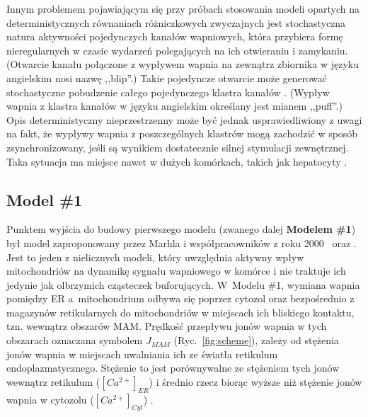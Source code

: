 Innym problemem pojawiającym się przy próbach stosowania modeli opartych na deterministycznych równaniach różniczkowych zwyczajnych jest stochastyczna natura aktywności pojedynczych kanałów wapniowych, która przybiera formę nieregularnych w czasie wydarzeń polegających na ich otwieraniu i zamykaniu. (Otwarcie kanału połączone z wypływem wapnia na zewnątrz zbiornika w języku angielskim nosi nazwę ,,blip''.) Takie pojedyncze otwarcie może generować stochastyczne pobudzenie całego pojedynczego klastra kanałów \cite{Skupin2010}. (Wypływ wapnia z klastra kanałów w języku angielskim określany jest mianem ,,puff''.) Opis deterministyczny nieprzestrzenny może być jednak usprawiedliwiony z uwagi na fakt, że wypływy wapnia z poszczególnych klastrów mogą zachodzić w sposób zsynchronizowany, jeśli są wynikiem dostatecznie silnej stymulacji zewnętrznej. Taka sytuacja ma miejsce nawet w dużych komórkach, takich jak hepatocyty \cite{Dupont2009}.

\FloatBarrier
\subsection{Model \#1}
\label{ss:Mo1}

Punktem wyjścia do budowy pierwszego modelu (zwanego dalej \textbf{Modelem \#1}) był model zaproponowany przez Marhla i współpracowników z roku 2000~\cite{Marhl2000} oraz \cite{Schuster2002}. Jest to jeden z nielicznych modeli, który uwzględnia aktywny wpływ mitochondriów na dynamikę sygnału wapniowego w komórce i nie traktuje ich jedynie jak olbrzymich cząsteczek buforujących. W~Modelu \#1, wymiana wapnia pomiędzy ER a~mitochondrium odbywa się poprzez cytozol oraz bezpośrednio z magazynów retikularnych do mitochondriów w miejscach ich bliskiego kontaktu, tzn. wewnątrz obszarów MAM. Prędkość przepływu jonów wapnia w tych obszarach oznaczana symbolem $J_{MAM}$ (Ryc.~\ref{fig:scheme}), zależy od stężenia jonów wapnia w miejscach uwalniania ich ze światła retikulum endoplazmatycznego. Stężenie to jest porównywalne ze stężeniem tych jonów wewnątrz retikulum ($[Ca^{2+}]_{ER}$) i średnio rzecz biorąc wyższe niż stężenie jonów wapnia w cytozolu ($[Ca^{2+}]_{Cyt}$) \cite{Dyzma2012}.

